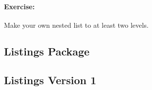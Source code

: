         \paragraph{Exercise:} Make your own nested list to at least two levels.

        \subsection{Listings Package}
        \label{Listings Package}
        
%
%
% 
%    
%
%

        \subsection{Listings Version 1}
        \label{Listings Version 1}
        
